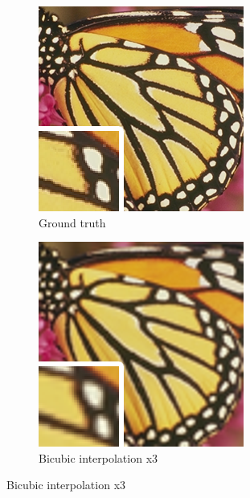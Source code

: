 \documentclass[
			fontsize = 12pt,
			paper = a4
			]
			{scrartcl}%
\newcommand{\?}{\ensuremath{^\texttt{\textbf [CITATION~NEEDED]}}}
\begin{document}
\begin{figure}[!ht]
     \centering
     \begin{subfigure}[b]{0.3\textwidth}
         \centering
         \caption{Ground truth}
         \includegraphics[width=\textwidth]{fig/examples/butterfly_GT}
     \end{subfigure}
     \hfill
     \begin{subfigure}[b]{0.3\textwidth}
         \centering
         \caption{Bicubic interpolation x3}
         \includegraphics[width=\textwidth]{fig/examples/butterfly_bicubic_x3}

\end{subfigure}
\end{figure}
\end{document}
